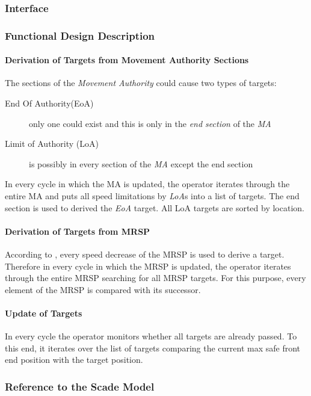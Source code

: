 \subsubsection{Interface}

\subsubsection{Functional Design Description}
\paragraph{Derivation of Targets from Movement Authority Sections}
The sections of the \emph{Movement Authority} could cause two types of targets:
\begin{description}
\item[End Of Authority(EoA)] only one could exist and this is only in the \emph{end section} of the \emph{MA}
\item[Limit of Authority (LoA)] is possibly in every section of the \emph{MA} except the end section
\end{description}
In every cycle in which the MA is updated, the operator iterates through the entire MA and puts all speed limitations by \emph{LoA}s into a list of targets. The end section is used to derived the \emph{EoA} target. All LoA targets are sorted by location.

\paragraph{Derivation of Targets from MRSP}
According to \cite[Chapt.~3.13.8.2]{subset-026}, every speed decrease of the MRSP is used to derive a target. Therefore in every cycle in which the MRSP is updated, the operator iterates through the entire MRSP searching for all MRSP targets. For this purpose, every element of the MRSP is compared with its successor.

\paragraph{Update of Targets}
In every cycle the operator monitors whether all targets are already passed. To this end, it iterates over the list of targets comparing the current max safe front end position with the target position.

 


\subsubsection{Reference to the Scade Model}


